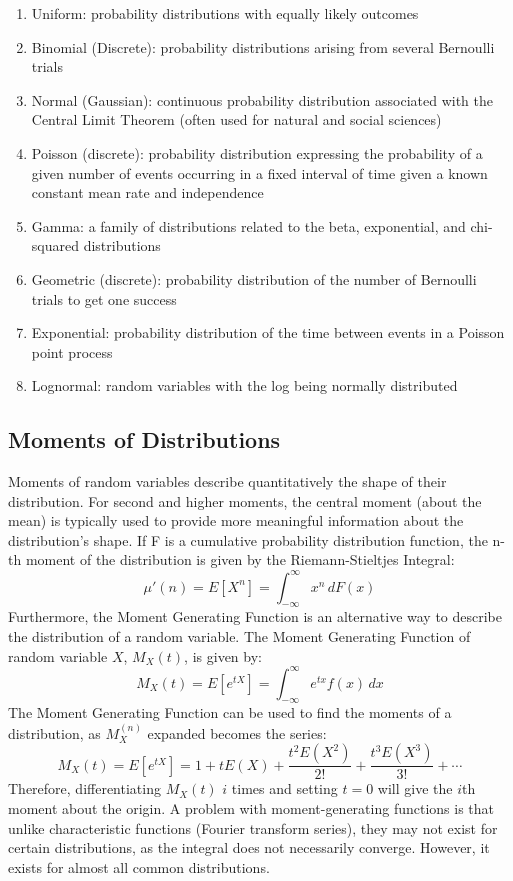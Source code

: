 \documentclass{article}
\begin{document}
\begin{enumerate}
    \item Uniform: probability distributions with equally likely outcomes
    \item Binomial (Discrete): probability distributions arising from several Bernoulli trials
    \item Normal (Gaussian): continuous probability distribution associated with the Central Limit Theorem (often used for natural and social sciences)
    \item Poisson (discrete): probability distribution expressing the probability of a given number of events occurring in a fixed interval of time given a known constant mean rate and independence
    \item Gamma: a family of distributions related to the beta, exponential, and chi-squared distributions
    \item Geometric (discrete): probability distribution of the number of Bernoulli trials to get one success  
    \item Exponential: probability distribution of the time between events in a Poisson point process
    \item Lognormal: random variables with the log being normally distributed
\end{enumerate}

\subsection{Moments of Distributions}
Moments of random variables describe quantitatively the shape of their distribution. For second and higher moments, the central moment (about the mean) is typically used to provide more meaningful information about the distribution's shape. If F is a cumulative probability distribution function, the n-th moment of the distribution is given by the Riemann-Stieltjes Integral:
\[\mu'(n) = E[X^n] = \int_{-\infty}^{\infty} x^n \,dF(x)\]
Furthermore, the Moment Generating Function is an alternative way to describe the distribution of a random variable. The Moment Generating Function of random variable \(X\), \(M_X(t)\), is given by:
\[ M_X(t) = E[e^{tX}] = \int_{-\infty}^{\infty} e^{tx} f(x) \,dx\]
The Moment Generating Function can be used to find the moments of a distribution, as \(M_X^(n)\) expanded becomes the series:
\[ M_X(t) = E[e^{tX}] = 1 + tE(X) + \frac{t^2E(X^2)}{2!} + \frac{t^3E(X^3)}{3!} + \cdots\]
Therefore, differentiating \(M_X(t)\) \(i\) times and setting \(t = 0\) will give the \(i\)th moment about the origin. A problem with moment-generating functions is that unlike characteristic functions (Fourier transform series), they may not exist for certain distributions, as the integral does not necessarily converge. However, it exists for almost all common distributions. 
\end{document}
